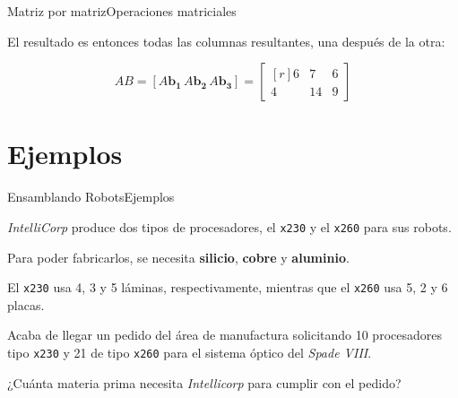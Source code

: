 \documentclass[spanish, c]{beamer}
\begin{document}
\begin{frame}{Matriz por matriz}{Operaciones matriciales}

    El resultado es entonces todas las columnas resultantes, una después de la otra:
    
    \bigskip

    \[
        AB = [A\mathbf{b_1} \, A\mathbf{b_2} \, A\mathbf{b_3}] =
        \begin{bmatrix*}[r]
            6 & 7 & 6 \\
            4 & 14 & 9
        \end{bmatrix*}
    \]

\end{frame}

\section{Ejemplos}

\begin{frame}{Ensamblando Robots}{Ejemplos}

    \textit{IntelliCorp} produce dos tipos de procesadores, el \texttt{x230} y el \texttt{x260} para sus robots.
    
    Para poder fabricarlos, se necesita \textbf{silicio}, \textbf{cobre} y \textbf{aluminio}.

    El \texttt{x230} usa 4, 3 y 5 láminas, respectivamente, mientras que el \texttt{x260} usa 5, 2 y 6 placas.

    Acaba de llegar un pedido del área de manufactura solicitando 10 procesadores tipo \texttt{x230} y 21 de tipo \texttt{x260} para el sistema óptico del \textit{Spade VIII}.
    
    \begin{center}
        ¿Cuánta materia prima necesita \textit{Intellicorp} para cumplir con el pedido?    
    \end{center}    

\end{frame}
\end{document}
